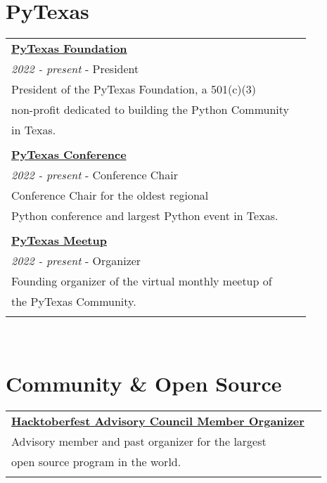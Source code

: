 \documentclass[10pt]{article} %
\newcommand\tab[1][1cm]{\hspace*{#1}}
\begin{document}
\begin{minipage}[t]{0.44\textwidth}
\section{PyTexas}

\begin{tabular}{ll}
\textbf{\href{https://pytexas.org}{PyTexas Foundation}}\\
\tab\textit{2022 - present} - President\\
\tab President of the PyTexas Foundation, a 501(c)(3)    \\
\tab non-profit dedicated to building the Python Community \\
\tab in Texas. \\
\\

\textbf{\href{https://pytexas.org/2024}{PyTexas Conference}}\\
\tab\textit{2022 - present} - Conference  Chair\\
\tab Conference Chair for the oldest regional   \\
\tab Python conference and largest Python event in Texas. \\
\\

\textbf{\href{https://pytexas.org/meetup}{PyTexas Meetup}}\\
\tab\textit{2022 - present} - Organizer\\
\tab Founding organizer of the virtual monthly meetup of   \\
\tab the PyTexas Community. \\
\\

\end{tabular}\\

\section{Community \& Open Source}

\begin{tabular}{ll}
\textbf{\href{https://hacktoberfest.digitalocean.com/}{Hacktoberfest  Advisory Council Member Organizer}}\\
\tab Advisory member and past organizer for the largest  \\
\tab open source program in the world. \\ 
\\


\end{tabular}
\end{minipage}
\end{document}
